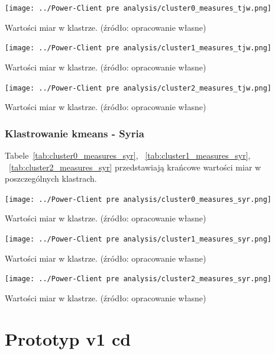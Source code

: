 \documentclass[11pt]{report}
\begin{document}
    \begin{table}[!htp]
        \centering
        \texttt{[image: ../Power-Client pre analysis/cluster0\_measures\_tjw.png]}
        \caption{Wartości miar w klastrze. (źródło: opracowanie własne)}
        \label{tab:cluster0_measures_tjw}
    \end{table}
    \begin{table}[!htp]
        \centering
        \texttt{[image: ../Power-Client pre analysis/cluster1\_measures\_tjw.png]}
        \caption{Wartości miar w klastrze. (źródło: opracowanie własne)}
        \label{tab:cluster1_measures_tjw}
    \end{table}
    \begin{table}[!htp]
        \centering
        \texttt{[image: ../Power-Client pre analysis/cluster2\_measures\_tjw.png]}
        \caption{Wartości miar w klastrze. (źródło: opracowanie własne)}
        \label{tab:cluster2_measures_tjw}
    \end{table}

    \subsection{Klastrowanie kmeans - Syria}\label{subsec:klastrowanie-kmeans---syria}
    Tabele~\ref{tab:cluster0_measures_syr},
    ~\ref{tab:cluster1_measures_syr},
    ~\ref{tab:cluster2_measures_syr}
    przedstawiają krańcowe wartości miar w poszczególnych klastrach.

    \begin{table}[!htp]
        \centering
        \texttt{[image: ../Power-Client pre analysis/cluster0\_measures\_syr.png]}
        \caption{Wartości miar w klastrze. (źródło: opracowanie własne)}
        \label{tab:cluster0_measures_syr}
    \end{table}
    \begin{table}[!htp]
        \centering
        \texttt{[image: ../Power-Client pre analysis/cluster1\_measures\_syr.png]}
        \caption{Wartości miar w klastrze. (źródło: opracowanie własne)}
        \label{tab:cluster1_measures_syr}
    \end{table}
    \begin{table}[!htp]
        \centering
        \texttt{[image: ../Power-Client pre analysis/cluster2\_measures\_syr.png]}
        \caption{Wartości miar w klastrze. (źródło: opracowanie własne)}
        \label{tab:cluster2_measures_syr}
    \end{table}


    \chapter{Prototyp v1 cd}
\end{document}
